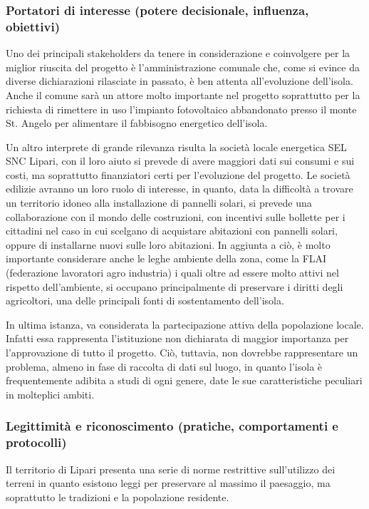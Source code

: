 \documentclass[fleqn,11pt]{SelfArx} %
\begin{document}
\subsubsection{Portatori di interesse (potere decisionale, influenza, obiettivi)}
Uno dei  principali stakeholders da tenere in considerazione e coinvolgere per la miglior riuscita del progetto è l'amministrazione comunale che, come si evince da diverse dichiarazioni rilasciate in passato,  è ben attenta all'evoluzione dell'isola. Anche il comune sarà un attore molto importante nel progetto soprattutto per la richiesta di rimettere in uso l'impianto fotovoltaico abbandonato presso il monte St. Angelo per alimentare il fabbisogno energetico dell'isola.  

Un altro interprete di grande rilevanza risulta la società locale energetica SEL SNC Lipari, con il loro aiuto si prevede di avere maggiori dati sui consumi e sui costi, ma soprattutto finanziatori certi per l'evoluzione del progetto.  Le società edilizie avranno un loro ruolo di interesse, in quanto, data la difficoltà a trovare un territorio idoneo alla installazione di pannelli solari, si prevede una collaborazione con il mondo delle costruzioni, con incentivi sulle bollette per i cittadini nel caso in cui scelgano di acquistare abitazioni con pannelli solari, oppure di installarne nuovi sulle loro abitazioni. In aggiunta a ciò, è molto importante considerare anche le leghe ambiente della zona, come la FLAI (federazione lavoratori agro industria) i quali oltre ad essere molto attivi nel rispetto dell'ambiente, si occupano principalmente di preservare i diritti degli agricoltori, una delle principali fonti di sostentamento dell'isola. 

In ultima istanza, va considerata la partecipazione attiva della popolazione locale. Infatti essa rappresenta l'istituzione non dichiarata  di maggior importanza per l'approvazione di tutto il progetto. Ciò, tuttavia, non dovrebbe rappresentare un problema, almeno in fase di raccolta di dati sul luogo, in quanto l'isola è frequentemente adibita a studi di ogni genere, date le sue caratteristiche peculiari in molteplici ambiti.

\subsubsection{Legittimità e riconoscimento (pratiche, comportamenti e protocolli)}
Il territorio di Lipari presenta una serie di norme restrittive sull'utilizzo dei terreni in quanto esistono leggi per preservare al massimo il paesaggio, ma soprattutto le tradizioni e la popolazione residente.  
\end{document}
